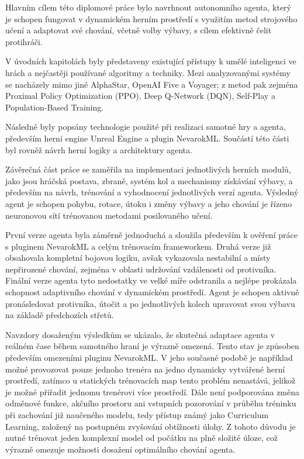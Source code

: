 Hlavním cílem této diplomové práce bylo navrhnout autonomního agenta, který je schopen fungovat v dynamickém herním prostředí s využitím metod strojového učení a adaptovat své chování, včetně volby výbavy, s cílem efektivně čelit protihráči.

V úvodních kapitolách byly představeny existující přístupy k umělé inteligenci ve hrách a nejčastěji používané algoritmy a techniky. Mezi analyzovanými systémy se nacházely mimo jiné AlphaStar, OpenAI Five a Voyager; z metod pak zejména Proximal Policy Optimization (PPO), Deep Q-Network (DQN), Self-Play a Population-Based Training.

Následně byly popsány technologie použité při realizaci samotné hry a agenta, především herní engine Unreal Engine a plugin NevarokML. Součástí této části byl rovněž návrh herní logiky a architektury agenta.

Závěrečná část práce se zaměřila na implementaci jednotlivých herních modulů, jako jsou hráčská postava, zbraně, systém kol a mechanismy získávání výbavy, a především na návrh, trénování a vyhodnocení jednotlivých verzí agenta. Výsledný agent je schopen pohybu, rotace, útoku i změny výbavy a jeho chování je řízeno neuronovou sítí trénovanou metodami posilovaného učení.

První verze agenta byla záměrně jednoduchá a sloužila především k ověření práce s pluginem NevarokML a celým trénovacím frameworkem. Druhá verze již obsahovala kompletní bojovou logiku, avšak vykazovala nestabilní a místy nepřirozené chování, zejména v oblasti udržování vzdálenosti od protivníka. Finální verze agenta tyto nedostatky ve velké míře odstranila a nejlépe prokázala schopnost adaptivního chování v dynamickém prostředí. Agent je schopen aktivně pronásledovat protivníka, útočit a po jednotlivých kolech upravovat svou výbavu na základě předchozích střetů.

Navzdory dosaženým výsledkům se ukázalo, že skutečná adaptace agenta v reálném čase během samotného hraní je výrazně omezená. Tento stav je způsoben především omezeními pluginu NevarokML. V jeho současné podobě je například možné provozovat pouze jednoho trenéra na jedno dynamicky vytvářené herní prostředí, zatímco u statických trénovacích map tento problém nenastává, jelikož je možné přiřadit jednomu trenérovi více prostředí. Dále není podporována změna odměnové funkce, akčního prostoru ani vstupních pozorování v průběhu tréninku při zachování již naučeného modelu, tedy přístup známý jako Curriculum Learning, založený na postupném zvyšování obtížnosti úlohy. Z tohoto důvodu je nutné trénovat jeden komplexní model od počátku na plně složité úloze, což výrazně omezuje možnosti dosažení optimálního chování agenta.